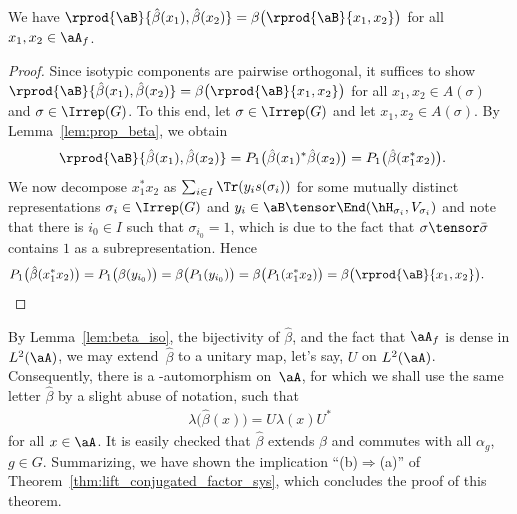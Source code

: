 \begin{Lemma}\label{lem:beta_iso}
	We have $\rprod{\aB}{\hat\beta(x_1), \hat\beta(x_2)} = \beta\bigl( \rprod{\aB}{x_1, x_2} \bigr)$ for all $x_1, x_2 \in \aA_f$.
\end{Lemma}
\begin{proof}
	Since isotypic components are pairwise orthogonal, it suffices to show $\rprod{\aB}{\hat\beta(x_1), \hat\beta(x_2)} \allowbreak = \beta\bigl( \rprod{\aB}{x_1, x_2} \bigr)$ for all $x_1, x_2 \in A(\sigma)$ and $\sigma \in \Irrep(G)$.
	To this end, let $\sigma \in \Irrep(G)$ and let $x_1, x_2 \in A(\sigma)$.
	By Lemma~\ref{lem:prop_beta}, we obtain
	\begin{align*}
		\rprod{\aB}{\hat\beta(x_1), \hat\beta(x_2)}
		&=
		P_1\big( \hat\beta(x_1)^*\hat\beta(x_2) \big)
		=
		P_1\big( \hat\beta(x_1^*x_2) \big).
	\end{align*}
	We now decompose $x_1^*x_2$ as $\sum_{i \in I} \Tr( y_i s(\sigma_i) )$ for some mutually distinct representations $\sigma_i \in \Irrep(G)$ and $y_i \in \aB \tensor \End(\hH_{\sigma_i},V_{\sigma_i})$ and note that there is $i_0 \in I$ such that $\sigma_{i_0} = 1$, which is due to the fact that $\sigma \tensor \bar \sigma$ contains $1$ as a subrepresentation.
	Hence
	\begin{gather*}
		P_1\big( \hat\beta(x_1^*x_2) \big)
		=
		P_1\big( \beta(y_{i_0}) \big)
		=
		\beta\big( P_1(y_{i_0}) \big)
		=
		\beta\big( P_1(x_1^*x_2) \big)
		=
		\beta\bigl( \rprod{\aB}{x_1, x_2} \bigr).
		\tag*{\qed}
	\end{gather*}
	\renewcommand{\qed}{}
\end{proof}

By Lemma~\ref{lem:beta_iso}, the bijectivity of $\hat \beta$, and the fact that $\aA_f$ is dense in $L^2(\aA)$, we may extend~$\hat \beta$ to a unitary map, let's say, $U$ on $L^2(\aA)$.
Consequently, there is a \Star-automorphism on~$\aA$, for which we shall use the same letter $\hat \beta$ by a slight abuse of notation, such that
\begin{align*}
	\lambda\big( \hat \beta(x) \big) = U \lambda(x) U^*
\end{align*}
for all $x \in \aA$.
It is easily checked that $\hat \beta$ extends $\beta$ and commutes with all $\alpha_g$, $g\in G$.
Summarizing, we have shown the implication ``(b)$\Rightarrow$(a)'' of Theorem~\ref{thm:lift_conjugated_factor_sys}, which concludes the proof of this theorem.
